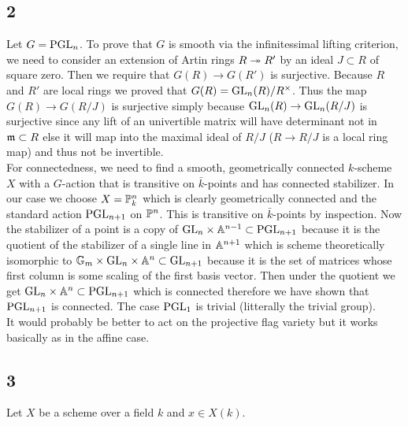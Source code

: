 \documentclass[12pt]{article}
\begin{document}
\subsection{2}

Let $G = \PGL_n$. To prove that $G$ is smooth via the infinitessimal lifting criterion, we need to consider an extension of Artin rings $R \onto R'$ by an ideal $J \subset R$ of square zero. Then we require that $G(R) \to G(R')$ is surjective. Because $R$ and $R'$ are local rings we proved that $G(R) = \GL_n(R)/R^\times$. Thus the map $G(R) \to G(R/J)$ is surjective simply because $\GL_n(R) \to \GL_n(R/J)$ is surjective since any lift of an univertible matrix will have determinant not in $\m \subset R$ else it will map into the maximal ideal of $R/J$ ($R \to R/J$ is a local ring map) and thus not be invertible. 
\bigskip\\
For connectedness, we need to find a smooth, geometrically connected $k$-scheme $X$ with a $G$-action that is transitive on $\bar{k}$-points and has connected stabilizer. In our case we choose $X = \P^n_k$ which is clearly geometrically connected and the standard action $\PGL_{n+1}$ on $\P^n$. This is transitive on $\bar{k}$-points by inspection. Now the stabilizer of a point is a copy of $\GL_n \times \A^{n-1} \subset \PGL_{n+1}$ because it is the quotient of the stabilizer of a single line in $\A^{n+1}$ which is scheme theoretically isomorphic to $\Gm \times \GL_n \times \A^{n} \subset \GL_{n+1}$ because it is the set of matrices whose first column is some scaling of the first basis vector. Then under the quotient we get $\GL_n \times \A^{n} \subset \PGL_{n+1}$ which is connected therefore we have shown that $\PGL_{n+1}$ is connected. The case $\PGL_1$ is trivial (litterally the trivial group).
\bigskip\\
It would probably be better to act on the projective flag variety but it works basically as in the affine case.

\subsection{3}

Let $X$ be a scheme over a field $k$ and $x \in X(k)$. 
\end{document}
